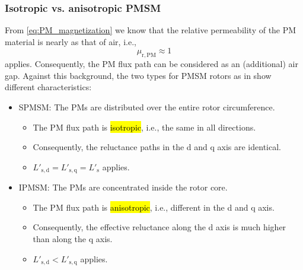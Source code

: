 \begin{frame}
	\frametitle{Isotropic vs. anisotropic PMSM}
	\onslide<+->
	From \eqref{eq:PM_magnetization} we know that the relative permeability of the PM material is nearly as that of air, i.e., $$\mu_\mathrm{r,PM} \approx 1$$ applies. \onslide<+-> Consequently, the PM flux path can be considered as an (additional) air gap. Against this background, the two types for PMSM rotors as in  show different characteristics:
	\vspace{0.5em}
	\begin{itemize}
		\item<+-> SPMSM: The PMs are distributed over the entire rotor circumference. 
		\begin{itemize}
			\item<+-> The PM flux path is \hl{isotropic}, i.e., the same in all directions.
			\item<+-> Consequently, the reluctance paths in the d and q axis are identical.
			\item<+-> $L'_\mathrm{s,d} =  L'_\mathrm{s,q} =L'_\mathrm{s}$ applies.
		\end{itemize}
		\vspace{0.5em}
		\item<+-> IPMSM: The PMs are concentrated inside the rotor core.
		\begin{itemize}
			\item<+-> The PM flux path is \hl{anisotropic}, i.e., different in the d and q axis.
			\item<+-> Consequently, the effective reluctance along the d axis is much higher than along the q axis.
			\item<+-> $L'_\mathrm{s,d} <  L'_\mathrm{s,q}$ applies.
		\end{itemize}
	\end{itemize}
\end{frame}

